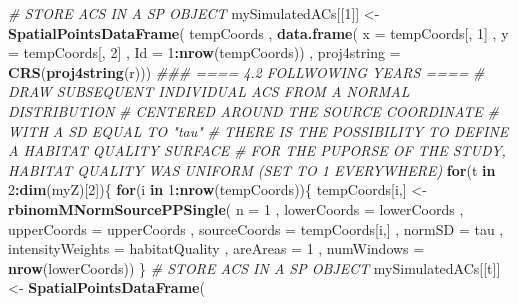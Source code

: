\documentclass[
]{article}
\newenvironment{Shaded}{\begin{snugshade}}{\end{snugshade}}
\newcommand{\CommentTok}[1]{\textcolor[rgb]{0.56,0.35,0.01}{\textit{#1}}}
\newcommand{\ControlFlowTok}[1]{\textcolor[rgb]{0.13,0.29,0.53}{\textbf{#1}}}
\newcommand{\DataTypeTok}[1]{\textcolor[rgb]{0.13,0.29,0.53}{#1}}
\newcommand{\DecValTok}[1]{\textcolor[rgb]{0.00,0.00,0.81}{#1}}
\newcommand{\KeywordTok}[1]{\textcolor[rgb]{0.13,0.29,0.53}{\textbf{#1}}}
\newcommand{\NormalTok}[1]{#1}
\newcommand{\OperatorTok}[1]{\textcolor[rgb]{0.81,0.36,0.00}{\textbf{#1}}}
\newcommand{\StringTok}[1]{\textcolor[rgb]{0.31,0.60,0.02}{#1}}
\begin{document}
\begin{Shaded}
\begin{Highlighting}[]
\CommentTok{# STORE ACS IN A SP OBJECT}
\NormalTok{mySimulatedACs[[}\DecValTok{1}\NormalTok{]] <-}\StringTok{ }\KeywordTok{SpatialPointsDataFrame}\NormalTok{( tempCoords}
\NormalTok{                                               , }\KeywordTok{data.frame}\NormalTok{( }\DataTypeTok{x =}\NormalTok{ tempCoords[, }\DecValTok{1}\NormalTok{]}
\NormalTok{                                                             , }\DataTypeTok{y =}\NormalTok{ tempCoords[, }\DecValTok{2}\NormalTok{]}
\NormalTok{                                                             , }\DataTypeTok{Id =} \DecValTok{1}\OperatorTok{:}\KeywordTok{nrow}\NormalTok{(tempCoords))}
\NormalTok{                                               , }\DataTypeTok{proj4string =} \KeywordTok{CRS}\NormalTok{(}\KeywordTok{proj4string}\NormalTok{(r)))}
\CommentTok{### ====  4.2 FOLLWOWING YEARS ====}
\CommentTok{# DRAW SUBSEQUENT INDIVIDUAL ACS FROM A NORMAL DISTRIBUTION }
\CommentTok{# CENTERED AROUND THE SOURCE COORDINATE}
\CommentTok{# WITH A SD EQUAL TO "tau"  }
\CommentTok{# THERE IS THE POSSIBILITY TO DEFINE A HABITAT QUALITY SURFACE}
\CommentTok{# FOR THE PUPORSE OF THE STUDY, HABITAT QUALITY WAS UNIFORM (SET TO 1 EVERYWHERE)}
\ControlFlowTok{for}\NormalTok{(t }\ControlFlowTok{in} \DecValTok{2}\OperatorTok{:}\KeywordTok{dim}\NormalTok{(myZ)[}\DecValTok{2}\NormalTok{])\{}
   \ControlFlowTok{for}\NormalTok{(i }\ControlFlowTok{in} \DecValTok{1}\OperatorTok{:}\KeywordTok{nrow}\NormalTok{(tempCoords))\{}
\NormalTok{      tempCoords[i,]  <-}\StringTok{ }\KeywordTok{rbinomMNormSourcePPSingle}\NormalTok{( }\DataTypeTok{n =} \DecValTok{1}
\NormalTok{                                                    , }\DataTypeTok{lowerCoords =}\NormalTok{ lowerCoords}
\NormalTok{                                                    , }\DataTypeTok{upperCoords =}\NormalTok{ upperCoords}
\NormalTok{                                                    , }\DataTypeTok{sourceCoords =}\NormalTok{ tempCoords[i,]}
\NormalTok{                                                    , }\DataTypeTok{normSD =}\NormalTok{ tau}
\NormalTok{                                                    , }\DataTypeTok{intensityWeights =}\NormalTok{ habitatQuality}
\NormalTok{                                                    , }\DataTypeTok{areAreas =} \DecValTok{1}
\NormalTok{                                                    , }\DataTypeTok{numWindows =} \KeywordTok{nrow}\NormalTok{(lowerCoords))}
\NormalTok{   \}}
   \CommentTok{# STORE ACS IN A SP OBJECT}
\NormalTok{   mySimulatedACs[[t]] <-}\StringTok{ }\KeywordTok{SpatialPointsDataFrame}\NormalTok{(}

\end{Highlighting}
\end{Shaded}
\end{document}
